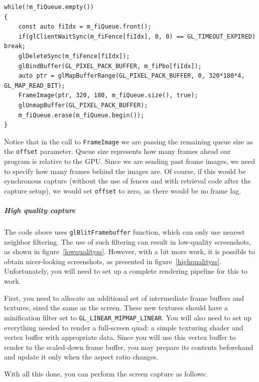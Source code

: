 \documentclass[hidelinks,titlepage,a4paper,twoside]{article}
\begin{document}
\begin{lstlisting}
while(!m_fiQueue.empty())
{
    const auto fiIdx = m_fiQueue.front();
    if(glClientWaitSync(m_fiFence[fiIdx], 0, 0) == GL_TIMEOUT_EXPIRED) break;
    glDeleteSync(m_fiFence[fiIdx]);
    glBindBuffer(GL_PIXEL_PACK_BUFFER, m_fiPbo[fiIdx]);
    auto ptr = glMapBufferRange(GL_PIXEL_PACK_BUFFER, 0, 320*180*4, GL_MAP_READ_BIT);
    FrameImage(ptr, 320, 180, m_fiQueue.size(), true);
    glUnmapBuffer(GL_PIXEL_PACK_BUFFER);
    m_fiQueue.erase(m_fiQueue.begin());
}
\end{lstlisting}

Notice that in the call to \texttt{FrameImage} we are passing the remaining queue size as the \texttt{offset} parameter. Queue size represents how many frames ahead our program is relative to the GPU. Since we are sending past frame images, we need to specify how many frames behind the images are. Of course, if this would be synchronous capture (without the use of fences and with retrieval code after the capture setup), we would set \texttt{offset} to zero, as there would be no frame lag.

\subparagraph{High quality capture}

The code above uses \texttt{glBlitFramebuffer} function, which can only use nearest neighbor filtering. The use of such filtering can result in low-quality screenshots, as shown in figure~\ref{lowqualityss}. However, with a bit more work, it is possible to obtain nicer-looking screenshots, as presented in figure~\ref{highqualityss}. Unfortunately, you will need to set up a complete rendering pipeline for this to work.

First, you need to allocate an additional set of intermediate frame buffers and textures, sized the same as the screen. These new textures should have a minification filter set to \texttt{GL\_LINEAR\_MIPMAP\_LINEAR}. You will also need to set up everything needed to render a full-screen quad: a simple texturing shader and vertex buffer with appropriate data. Since you will use this vertex buffer to render to the scaled-down frame buffer, you may prepare its contents beforehand and update it only when the aspect ratio changes.

With all this done, you can perform the screen capture as follows:
\end{document}
